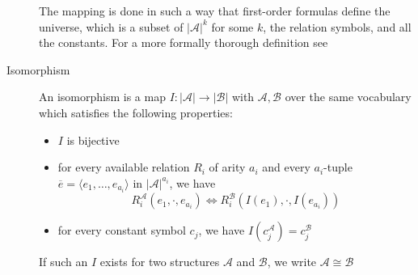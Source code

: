 \begin{description}
    The mapping is done in such a way that first-order formulas define the universe, which is a subset of $|\mathcal{A}|^k$ for some $k$, the relation symbols, and all the constants.
    For a more formally thorough definition see~\cite{descriptive-complexity}
    \item[Isomorphism] An isomorphism is a map $I: |\mathcal{A}| \to |\mathcal{B}|$ with $\mathcal{A}, \mathcal{B}$ over the same vocabulary which satisfies the following properties:
    \begin{itemize}
        \setlength\itemsep{0.15em}
        \item $I$ is bijective
        \item for every available relation $R_i$ of arity $a_i$ and every $a_i$-tuple $\overline{e} = \langle e_1, \dots, e_{a_i} \rangle$ in $|\mathcal{A}|^{a_i}$, we have \[R_i^{\mathcal{A}}(e_1, \cdot, e_{a_i}) \Leftrightarrow R_i^{\mathcal{B}}(I(e_1), \cdot, I(e_{a_i}))\]
        \item for every constant symbol $c_j$, we have $I(c_j^{\mathcal{A}}) = c_j^{\mathcal{B}}$
    \end{itemize}
    If such an $I$ exists for two structures $\mathcal{A}$ and $\mathcal{B}$, we write $\mathcal{A} \cong \mathcal{B}$
\end{description}



